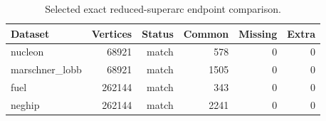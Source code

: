 \begin{table}[htbp]
\centering
\small
\caption{Selected exact reduced-superarc endpoint comparison.}
\label{tab:exact-edge-selected}
\begin{tabular}{lrrrrr}
\hline
Dataset & Vertices & Status & Common & Missing & Extra \\
\hline
nucleon & 68921 & match & 578 & 0 & 0 \\
marschner\_lobb & 68921 & match & 1505 & 0 & 0 \\
fuel & 262144 & match & 343 & 0 & 0 \\
neghip & 262144 & match & 2241 & 0 & 0 \\
\hline
\end{tabular}
\end{table}
